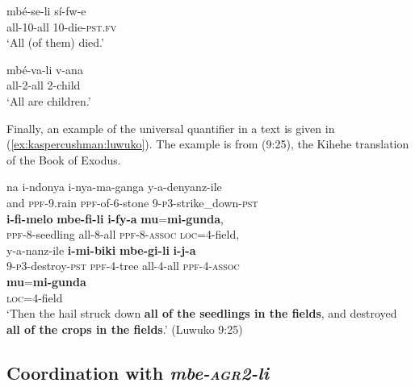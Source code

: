 \documentclass[letterpaper, 12pt]{article}
\begin{document}
\begin{exe}
\ex \label{ex:kaspercushman:allofthemdied} \gll mb\'e-se-li s\'i-fw-e \\ 
all-10-all 10-die-\textsc{pst}.\textsc{fv} \\
`All (of them) died.' 

\end{exe}

\begin{exe}
\ex \label{ex:kaspercushman:allarechildren} \gll mb\'e-va-li v-ana \\
all-2-all 2-child \\
`All are children.'
\end{exe}


Finally, an example of the universal quantifier in a text is given in (\ref{ex:kaspercushman:luwuko}). The example is from \citet{ex:kaspercushman:luwuko} (9:25), the Kihehe translation of the Book of Exodus.

\begin{exe} 
\singlespacing 

\ex\gll na i-ndonya i-nya-ma-ganga y-a-denyanz-ile \\ 
and \textsc{ppf}-9.rain \textsc{ppf}-of-6-stone 9-\textsc{p3}-strike\_down-\textsc{pst}\\

\gll \textbf{i-fi-melo} \textbf{mbe-fi-li} \textbf{i-fy-a} \textbf{mu}=\textbf{mi-gunda}, \\
\textsc{ppf}-8-seedling all-8-all \textsc{ppf}-8-\textsc{assoc} \textsc{loc}=4-field,\\

\gll y-a-nanz-ile \textbf{i-mi-biki} \textbf{mbe-gi-li} \textbf{i-j-a}  \\
9-\textsc{p3}-destroy-\textsc{pst} \textsc{ppf}-4-tree all-4-all \textsc{ppf}-4-\textsc{assoc}  \\

\gll \textbf{mu}=\textbf{mi-gunda} \\ 
\textsc{loc}=4-field \\


`Then the hail struck down \textbf{all of the seedlings in the fields}, and destroyed \textbf{all of the crops in the fields}.' \hfill{(Luwuko 9:25)} \label{ex:kaspercushman:luwuko}\\

\end{exe}

\subsection{Coordination with \emph{mbe-\textsc{agr2}-li}}
\end{document}
